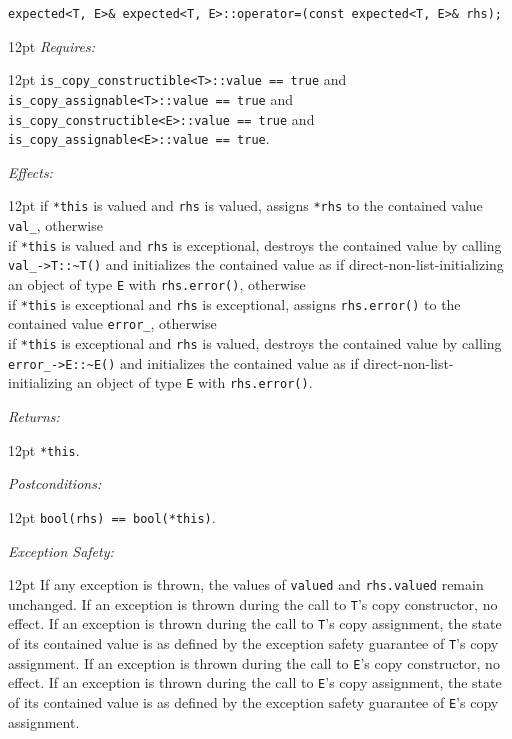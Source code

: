 \documentclass[a4paper,10pt]{article}
\newcommand{\cpp}[1]{\lstinline{#1}}
\newcommand{\wordingItem}[1]{\noindent\textit{#1:}}
\newenvironment{wordingTextItem}[1]{\wordingItem{#1}\vspace{7pt}\noindent\begin{adjustwidth}{12pt}{}}{\vspace{7pt}\end{adjustwidth}}
\newenvironment{wordingPara}{\begin{adjustwidth}{12pt}{}}{\end{adjustwidth}}
\begin{document}
\begin{lstlisting}[xleftmargin=0pt]
expected<T, E>& expected<T, E>::operator=(const expected<T, E>& rhs); 
\end{lstlisting}
\begin{wordingPara}
\begin{wordingTextItem}{Requires}
\cpp{is_copy_constructible<T>::value == true} and\\
\cpp{is_copy_assignable<T>::value == true} and\\
\cpp{is_copy_constructible<E>::value == true} and\\
\cpp{is_copy_assignable<E>::value == true}.
\end{wordingTextItem}
\begin{wordingTextItem}{Effects}
if \cpp{*this} is valued and \cpp{rhs} is valued, assigns \cpp{*rhs} to the contained value \cpp{val_}, otherwise \\
if \cpp{*this} is valued and \cpp{rhs} is exceptional, destroys the contained value by calling \cpp{val_->T::~T()} and  initializes the contained value as if direct-non-list-initializing an object of type \cpp{E} with \cpp{rhs.error()}, otherwise \\
if \cpp{*this} is exceptional and \cpp{rhs} is exceptional, assigns \cpp{rhs.error()} to the contained value \cpp{error_}, otherwise \\
if \cpp{*this} is exceptional and \cpp{rhs} is valued, destroys the contained value by calling \cpp{error_->E::~E()} and  initializes the contained value as if direct-non-list-initializing an object of type \cpp{E} with \cpp{rhs.error()}.
\end{wordingTextItem}
\begin{wordingTextItem}{Returns}
\cpp{*this}.
\end{wordingTextItem}
\begin{wordingTextItem}{Postconditions}
\cpp{bool(rhs) == bool(*this)}.
\end{wordingTextItem}
\begin{wordingTextItem}{Exception Safety}
If any exception is thrown, the values of \cpp{valued} and \cpp{rhs.valued} remain unchanged. If an exception is thrown during the call to \cpp{T}'s copy constructor, no effect. If an exception is thrown during the call to \cpp{T}'s copy assignment, the state of its contained value is as defined by the exception safety guarantee of \cpp{T}'s copy assignment. If an exception is thrown during the call to \cpp{E}'s copy constructor, no effect. If an exception is thrown during the call to \cpp{E}'s copy assignment, the state of its contained value is as defined by the exception safety guarantee of \cpp{E}'s copy assignment.
\end{wordingTextItem}
\end{wordingPara}
\end{document}
